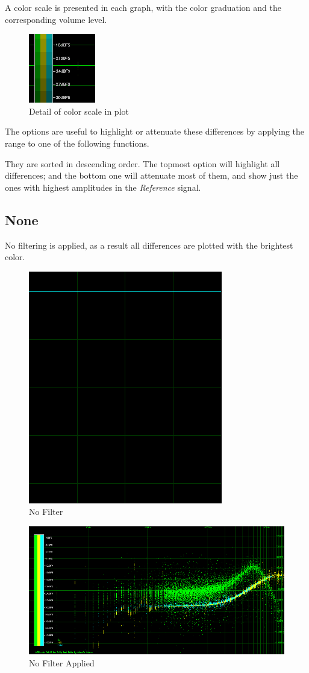 \documentclass[10pt,a4paper]{report}
\begin{document}
A color scale is presented in each graph, with the color graduation and the corresponding volume level.

\begin{figure}[H]
	\centering
	\includegraphics[width=0.2\linewidth]{plots/colorscale}
	\caption{Detail of color scale in plot}
	\label{fig:colorscale}
\end{figure}


The options are useful to highlight or attenuate these differences by applying the range to one of the following functions. 

They are sorted in descending order. The topmost option will highlight all differences; and the bottom one will attenuate most of them, and show just the ones with highest amplitudes in the \textit{Reference} signal.

\subsection{None} 

No filtering is applied, as a result all differences are plotted with the brightest color. 

\begin{figure}[H]
	\centering
	\includegraphics[width=0.4\linewidth]{plots/BetaFunctionPlot_0}
	\caption[No Filter]{No Filter}
	\label{fig:betafunctionplot0}
\end{figure}

\begin{figure}[H]
	\centering
	\includegraphics[width=1\linewidth]{plots/BetaFunctionPlot_0_Data}
	\caption[No Filter]{No Filter Applied}
	\label{fig:betafunctionplot0data}
\end{figure}
\end{document}
